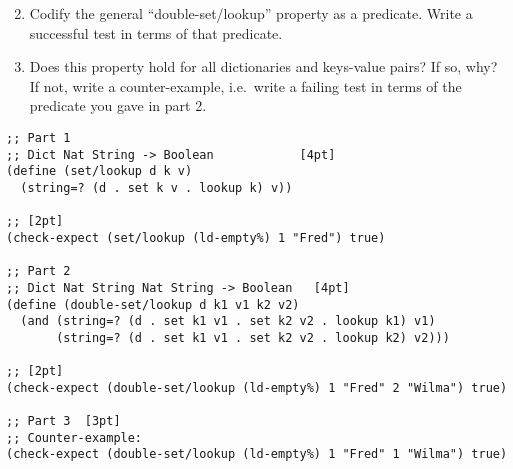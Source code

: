 \documentclass[12pt]{article}                   %
\newenvironment{solution}{}{}
\begin{document}
\begin{problem}
\begin{enumerate}
\setcounter{enumi}{1}
\item Codify the general ``double-set/lookup'' property as a
  predicate.  Write a successful test in terms of that predicate.

\item Does this property hold for all dictionaries and keys-value
  pairs?  If so, why?  If not, write a counter-example, i.e.~write a
  failing test in terms of the predicate you gave in part 2.
\end{enumerate}

\ifrubric\else
{}
\newpage
\fi
\end{problem}

\begin{solution}
\begin{verbatim}
;; Part 1 
;; Dict Nat String -> Boolean            [4pt]
(define (set/lookup d k v)
  (string=? (d . set k v . lookup k) v))

;; [2pt]
(check-expect (set/lookup (ld-empty%) 1 "Fred") true)

;; Part 2
;; Dict Nat String Nat String -> Boolean   [4pt]
(define (double-set/lookup d k1 v1 k2 v2)
  (and (string=? (d . set k1 v1 . set k2 v2 . lookup k1) v1)
       (string=? (d . set k1 v1 . set k2 v2 . lookup k2) v2)))

;; [2pt]
(check-expect (double-set/lookup (ld-empty%) 1 "Fred" 2 "Wilma") true)

;; Part 3  [3pt]
;; Counter-example:
(check-expect (double-set/lookup (ld-empty%) 1 "Fred" 1 "Wilma") true)
\end{verbatim}
\end{solution}
\end{document}
